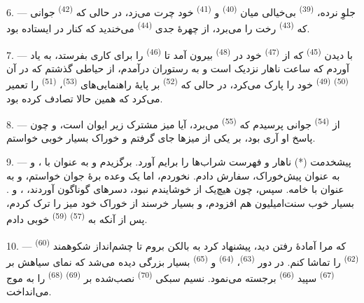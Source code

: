 \VUsaut{4.0mm}
\VUsaut{3.0mm}

6. --- جلوِ نرده،  \textsuperscript{(39)} بی‌خیالی میان
 \textsuperscript{(40)} و 
\textsuperscript{(41)} خود چرت می‌زد، در حالی که 
\textsuperscript{(42)} جوانی که  \textsuperscript{(43)}
رخت را می‌برد، از چهرهٔ جدی  \textsuperscript{(44)}
می‌خندید که کنار در ایستاده بود.

7. --- با دیدن  \textsuperscript{(45)} که از
 \textsuperscript{(47)} خود در 
\textsuperscript{(48)} بیرون آمد تا 
\textsuperscript{(46)} را برای کاری بفرستد، به یاد آوردم که ساعت ناهار
نزدیک است و به رستوران درآمدم، از حیاطی گذشتم که در آن
 \textsuperscript{(50)} 
\textsuperscript{(49)} خود را پارک می‌کرد، در حالی که 
\textsuperscript{(52)} بر پایهٔ راهنمایی‌های 
\textsuperscript{(53)}،  \textsuperscript{(51)}
را تعمیر می‌کرد که همین حالا تصادف کرده بود.

8. --- از  \textsuperscript{(54)} جوانی پرسیدم که
 \textsuperscript{(55)} می‌برد، آیا میز مشترک
زیر ایوان است، و چون پاسخ او آری بود، بر یکی از میزها جای گرفتم و
خوراک بسیار خوبی خواستم.

\textit{}

\VUsaut{4.0mm}
\VUsaut{3.0mm}

9. --- پیشخدمت  (*) ناهار و فهرست شراب‌ها را برایم آورد.
برگزیدم و به عنوان  با ، و به عنوان
پیش‌خوراک،  سفارش دادم. 
نخوردم، اما یک وعده  برهٔ جوان خواستم، و به عنوان
 با خامه. سپس، چون هیچ‌یک از
 خوشایندم نبود، دسرهای گوناگون آوردند،
،  و .  بسیار
خوب سنت‌امیلیون هم افزودم، و بسیار خرسند از خوراک خود میز را ترک کردم،
پس از آنکه به  \textsuperscript{(57)}
 \textsuperscript{(59)} خوبی دادم.

10. ---  \textsuperscript{(60)} که مرا آمادهٔ رفتن دید،
پیشنهاد کرد به بالکن بروم تا چشم‌انداز شکوهمند 
\textsuperscript{(62)} را تماشا کنم. در دور 
\textsuperscript{(63)}، 
\textsuperscript{(64)} و  \textsuperscript{(65)}
بسیار بزرگی دیده می‌شد که نمای سیاهش بر 
\textsuperscript{(67)} سپید  \textsuperscript{(66)}
برجسته می‌نمود. نسیم سبکی  \textsuperscript{(70)} نصب‌شده
بر  \textsuperscript{(69)} 
\textsuperscript{(68)} را به موج می‌انداخت.

